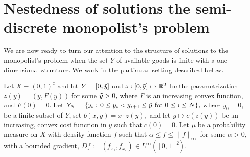 \documentclass[12pt,reqno]{amsart}
\begin{document}
    
\section{Nestedness of solutions the semi-discrete monopolist's problem}\label{sect: nestedness in semi-discrete monopolist's}
We are now ready to turn our attention to the structure of solutions to the monopolist's problem when the set $Y$ of available goods is finite with a one-dimensional structure.  We work in the particular setting described below. 


Let $X=(0,1)^2$ and let $Y=[0,\Tilde{y}]$ and $z:[0,\Tilde{y}]\mapsto \mathbb{R}^2$ be the parametrization $z(y)=(y,F(y))$ for some $\Tilde{y}>0,$ where $F$ is an increasing convex function, and $F(0)=0.$ Let $Y_N=\{ y_i:\, 0\le y_i<y_{i+1}\le \Tilde{y} \text{ for  } 0\le i \le N\},$ where $y_0=0$, be a finite subset of $Y$, set $b(x,y)=x\cdot z(y),$ and let $y \mapsto c(z(y))$ be an increasing, convex cost function in $y$ such that $c(0)=0$. Let $\mu$ be a probability measure on $X$ with density function $f$ such that $\alpha\le f\le \|f\|_\infty$ for some $\alpha>0,$ with a bounded gradient, $Df:=(f_{x_1},f_{x_2}) \in L^{\infty}([0,1]^2)$. 

\end{document}
